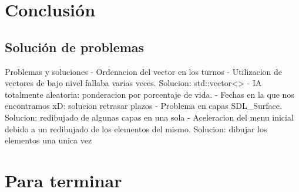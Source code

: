 \documentclass[9pt,xcolor=svgnames]{beamer}
\begin{document}
  


 \section{Conclusión}
 
  \subsection{Solución de problemas}

  \begin{frame}{Problemas y soluciones}
   - Ordenacion del vector en los turnos
   - Utilizacion de vectores de bajo nivel fallaba varias
     veces. Solucion: std::vector<> 
   - IA totalmente aleatoria: ponderacion por porcentaje de vida.
   - Fechas en la que nos encontramos xD: solucion retrasar plazos
   - Problema en capas SDL\_Surface. Solucion: redibujado de algunas
     capas en una sola
   - Aceleracion del menu inicial debido a un redibujado de los
     elementos del mismo. Solucion: dibujar los elementos una unica vez

  
  \end{frame}
  
  
 \section{Para terminar}
  

  
\end{document}
